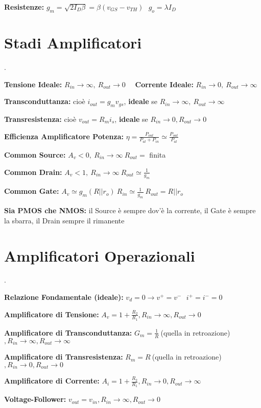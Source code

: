 \documentclass[12pt]{extarticle}
\begin{document}
{\bf Resistenze:} $\displaystyle g_m = \sqrt{2I_D\beta} = \beta(v_{GS}-v_{TH})\ \ \ g_o = \lambda I_D$

\section{Stadi Amplificatori}.

{\bf Tensione Ideale:} $R_{in} \to \infty, \ R_{out} \to 0 $ \ \ {\bf Corrente Ideale:} $R_{in} \to 0, \ R_{out} \to \infty $ 

{\bf Transconduttanza:} cioè $ i_{out} = g_mv_{gs} $, {\bf ideale} se $R_{in} \to \infty, \ R_{out} \to \infty$

{\bf Transresistenza:} cioè $ v_{out} = R_mi_s$, {\bf ideale} se $R_{in} \to 0, R_{out} \to 0$ 

{\bf Efficienza Amplificatore Potenza:} $\displaystyle \eta = \frac{P_{out}}{P_{al}+P_{in}} \simeq \frac{P_{out}}{P_{al}}$ 

{\bf Common Source:} $ A_v < 0, \ R_{in} \to \infty \ R_{out} = $ finita 

{\bf Common Drain:} $ A_v < 1, \ R_{in} \to \infty \ R_{out} \simeq \frac{1}{g_m}$	

{\bf Common Gate:} $ A_v \simeq g_m(R || r_o) \ R_{in} \simeq \frac{1}{g_m} \ R_{out} = R || r_o$ 

{\bf Sia PMOS che NMOS:} il Source è sempre dov'è la corrente, il Gate è sempre la sbarra, il Drain sempre il rimanente

\section{Amplificatori Operazionali}.

{\bf Relazione Fondamentale (ideale):} $\displaystyle v_d = 0 \to v^+ = v^- \ \ \ i^+ = i^- = 0$

{\bf Amplificatore di Tensione:} $\displaystyle A_v = 1+\frac{R_2}{R_1}, R_{in} \to \infty, R_{out} \to 0$

{\bf Amplificatore di Transconduttanza:} $\displaystyle G_m = \frac{1}{R} \ $(quella in retroazione)$, R_{in} \to \infty, R_{out} \to \infty$

{\bf Amplificatore di Transresistenza: } $\displaystyle R_m = R \ $(quella in retroazione)$, R_{in} \to 0, R_{out} \to 0$

{\bf Amplificatore di Corrente:} $\displaystyle A_i = 1+\frac{R_2}{R_1}, R_{in} \to 0, R_{out} \to \infty$

{\bf Voltage-Follower:} $\displaystyle v_{out} = v_{in}, R_{in} \to \infty, R_{out} \to 0$
\end{document}
